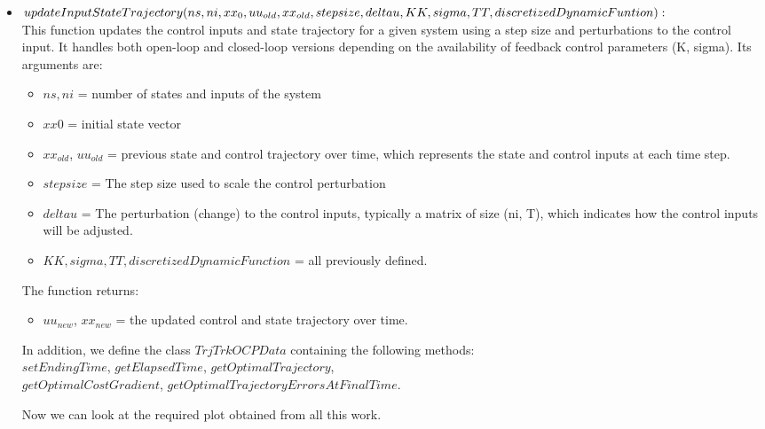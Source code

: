 \documentclass[a4paper,11pt,oneside]{book}
\begin{document}
\begin{itemize}
    \item $updateInputStateTrajectory(ns, ni, xx_0, uu_{old}, xx_{old}, stepsize, deltau,\\ KK, sigma, TT, discretizedDynamicFuntion):$\\
    This function updates the control inputs and state trajectory for a given system using a step size and perturbations to the control input. It handles both open-loop and closed-loop versions depending on the availability of feedback control parameters (K, sigma). Its arguments are:
    \begin{itemize}
        \item $ns, ni$ = number of states and inputs of the system 
        \item $xx0$ = initial state vector
        \item $xx_{old}$, $uu_{old}$ = previous state and control trajectory over time, which represents the state and control inputs at each time step.
        \item $stepsize$ = The step size used to scale the control perturbation
        \item $deltau$ = The perturbation (change) to the control inputs, typically a matrix of size (ni, T), which indicates how the control inputs will be adjusted.
        \item $KK, sigma, TT, discretizedDynamicFunction$ = all previously defined.
    \end{itemize}
    The function returns:
    \begin{itemize}
        \item $uu_{new}$, $xx_{new}$ = the updated control and state trajectory over time.
    \end{itemize}
    In addition, we define the class $TrjTrkOCPData$ containing the following methods:\\ $setEndingTime$, $getElapsedTime$, $getOptimalTrajectory$,\\ $getOptimalCostGradient$, $getOptimalTrajectoryErrorsAtFinalTime$.
\begin{flushleft}
    Now we can look at the required plot obtained from all this work.
\end{flushleft}
\begin{figure}[ht]
    \begin{minipage}[t]{0.48\textwidth}
        \centering

\end{minipage}
\end{figure}
\end{itemize}
\end{document}
